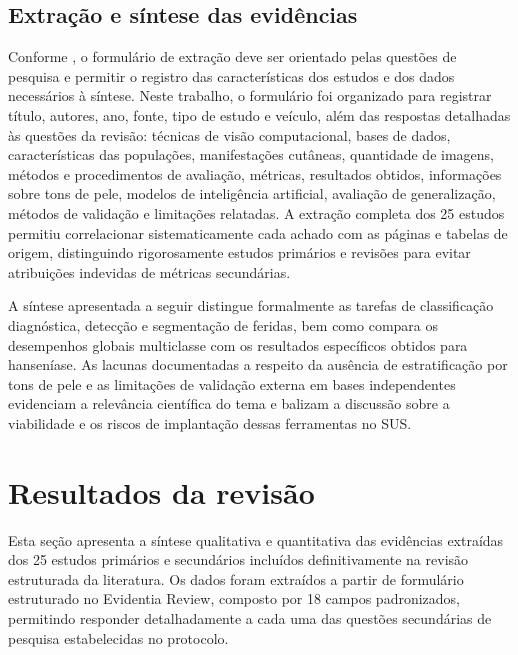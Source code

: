 \subsection{Extração e síntese das evidências}

Conforme , o formulário de extração
deve ser orientado pelas questões de pesquisa e permitir o registro das
características dos estudos e dos dados necessários à síntese. Neste
trabalho, o formulário foi organizado para registrar título, autores,
ano, fonte, tipo de estudo e veículo, além das respostas detalhadas às questões da
revisão: técnicas de visão computacional, bases de dados, características das populações, manifestações cutâneas, quantidade de
imagens, métodos e procedimentos de avaliação, métricas, resultados obtidos, informações sobre tons de pele,
modelos de inteligência artificial, avaliação de generalização, métodos de validação e limitações relatadas. A extração completa dos 25 estudos permitiu correlacionar sistematicamente cada achado com as páginas e tabelas de origem, distinguindo rigorosamente estudos primários e revisões para evitar atribuições indevidas de métricas secundárias.

A síntese apresentada a seguir distingue formalmente as tarefas de classificação diagnóstica, detecção e segmentação de feridas, bem
como compara os desempenhos globais multiclasse com os resultados específicos obtidos para hanseníase. As lacunas documentadas a respeito da ausência de estratificação por tons de pele e as limitações de validação externa em bases independentes evidenciam a relevância científica do tema e balizam a discussão sobre a viabilidade e os riscos de implantação dessas ferramentas no SUS.

\section{Resultados da revisão}
\label{sec:resultados-revisao}

Esta seção apresenta a síntese qualitativa e quantitativa das evidências
extraídas dos 25 estudos primários e secundários incluídos definitivamente
na revisão estruturada da literatura. Os dados foram extraídos a partir de
formulário estruturado no Evidentia Review, composto por 18 campos padronizados,
permitindo responder detalhadamente a cada uma das questões secundárias de
pesquisa estabelecidas no protocolo.

\nocite{fernandes2024,andrade2025,deps2024,deps2026,yotsu2023,jitendra2024deep,nyatte2022,vargasclavijo2025,goswami2026,prayitno2026,sall2025,ahikpa2025,barbieri2022,baweja2023,pons2026,innocent2026,beesetty2023,jitendra2024heuristic,gawali2024,yotsu2025,sanchez2024,mehta2026,eita2025,jaikishore2021,banerjee2023,baweja2016,souza2021,joerg2025}

